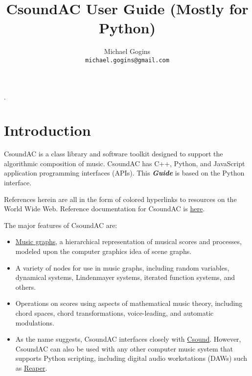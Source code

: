 \documentclass[letterpaper,10pt,DIV=12,parskip=half]{scrartcl}
\begin{document}
.

\title{CsoundAC User Guide (Mostly for Python)}
\author{Michael Gogins \\ \texttt{michael.gogins@gmail.com}}
\maketitle

\section{Introduction}

CsoundAC is a class library and software toolkit designed to support the algorithmic composition of music. CsoundAC has C++, Python, and JavaScript application programming interfaces (APIs). This \emph{\textbf{Guide}} is based on the Python interface. 

References herein are all in the form of colored hyperlinks to resources on the World Wide Web. Reference documentation for CsoundAC is \href{https://github.com/gogins/csound-ac/blob/master/csound-ac.pdf}{here}.

The major features of CsoundAC are:

\begin{itemize}
\item  \href{https://quod.lib.umich.edu/i/icmc/bbp2372.1998.298/1}{Music graphs}, a hierarchical representation of musical scores and processes, modeled upon the computer graphics idea of scene graphs. 

\item A variety of nodes for use in music graphs, including random variables, dynamical systems, Lindenmayer systems, iterated function systems, and others.

\item Operations on scores using aspects of mathematical music theory, including chord spaces, chord transformations, voice-leading, and automatic modulations. 

\item As the name suggests, CsoundAC interfaces closely with \href{https://csound.com/}{Csound}. However, CsoundAC can also be used with any other computer music system that supports Python scripting, including digital audio workstations (DAWs) such as \href{https://www.reaper.fm/}{Reaper}.

\end{itemize}
\end{document}
